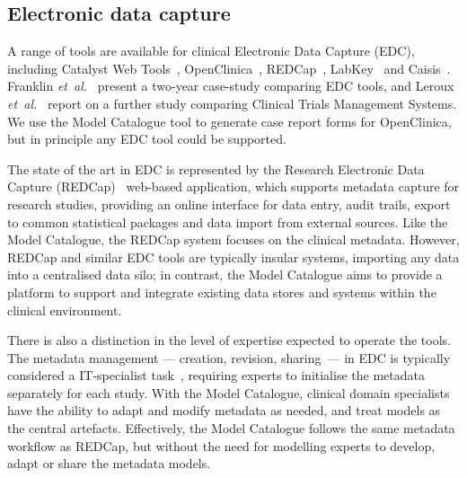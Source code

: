 \subsection{Electronic data capture}

A range of tools are available for clinical Electronic Data Capture
(EDC), including Catalyst Web Tools~\cite{catalyst},
OpenClinica~\cite{oc}, REDCap~\cite{harr09}, LabKey~\cite{labk} and
Caisis~\cite{cais}. Franklin \textit{et~al.}~\cite{fran11} present
a two-year case-study comparing EDC tools, 
and Leroux \textit{et~al.}~\cite{lero11} report on
a further study comparing Clinical Trials Management Systems. 
We use the Model Catalogue tool to generate
case report forms for OpenClinica, but in principle any EDC tool could be
supported. 

The state of the art in EDC is represented by the Research Electronic Data
Capture (REDCap)~\cite{harr09} web-based application, which
supports metadata capture for research studies, providing an online
interface for data entry, audit trails, export to common statistical
packages and data import from external sources. Like the Model
Catalogue, the REDCap system focuses on the clinical
metadata. However, REDCap and similar EDC tools are typically 
insular systems, importing any data into a centralised data silo;
in contrast, the Model
Catalogue aims to provide a platform to support and integrate 
existing data stores
and systems within the clinical environment.

There is also a distinction in the level of expertise expected to operate
the tools. The metadata management --- creation, revision, sharing~--- in
EDC is typically considered a IT-specialist task~\cite{harr09,fran11}, requiring
experts to initialise the metadata separately for each study. With the Model
Catalogue, clinical domain specialists have the ability to adapt and modify
metadata as needed, and treat models as the central
artefacts. Effectively, the Model Catalogue follows the same metadata
workflow as REDCap, but without the need for modelling experts to
develop, adapt or share the metadata models. 


